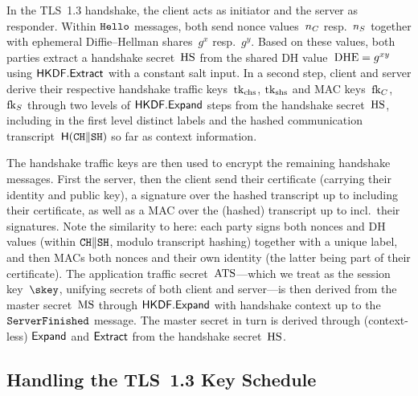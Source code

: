 In the TLS~1.3 handshake, the client acts as initiator and the server as responder.
Within $\mathtt{Hello}$ messages, both send nonce values~$n_C$ resp.\ $n_S$ together with ephemeral Diffie--Hellman shares~$g^x$ resp.\ $g^y$.
Based on these values, both parties extract a handshake secret~$\mathrm{HS}$ from the shared DH value~$\mathrm{DHE} = g^{xy}$ using $\mathsf{HKDF}.\mathsf{Extract}$ with a constant salt input.%
In a second step, client and server derive their respective handshake traffic keys~$\mathrm{tk}_{\text{chs}}$, $\mathrm{tk}_{\text{shs}}$ and MAC keys~$\mathrm{fk}_C$, $\mathrm{fk}_S$ through two levels of $\mathsf{HKDF}.\mathsf{Expand}$ steps from the handshake secret~$\mathrm{HS}$, including in the first level distinct labels and the hashed communication transcript~$\mathsf{H}(\mathtt{CH} \| \mathtt{SH})$ so far as context information.

The handshake traffic keys are then used to encrypt the remaining handshake messages.
First the server, then the client send their certificate (carrying their identity and public key), a signature over the hashed transcript up to including their certificate, as well as a MAC over the (hashed) transcript up to incl.\ their signatures.
Note the similarity to \SIGMAI here:
each party signs both nonces and DH values (within $\mathtt{CH} \| \mathtt{SH}$, modulo transcript hashing) together with a unique label,
and then MACs both nonces and their own identity (the latter being part of their certificate).%
The application traffic secret~$\mathrm{ATS}$---which we treat as the session key~$\skey$, unifying secrets of both client and server---is then derived from the master secret~$\mathrm{MS}$ through $\mathsf{HKDF}.\mathsf{Expand}$ with handshake context up to the $\mathtt{ServerFinished}$ message.
The master secret in turn is derived through (context-less) $\mathsf{Expand}$ and $\mathsf{Extract}$ from the handshake secret~$\mathrm{HS}$.


\iffull
\subsection{Handling the TLS~1.3 Key Schedule}
\else
